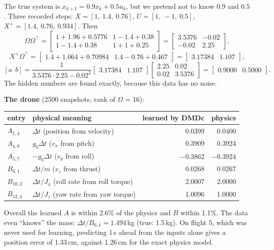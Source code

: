 \begin{toy}
The true system is $x_{k+1}=0.9x_k+0.5u_k$, but we pretend not to know $0.9$ and $0.5$. Three recorded steps:
$X=[1,\ 1.4,\ 0.76]$, $U=[1,\ -1,\ 0.5]$, $X^+=[1.4,\ 0.76,\ 0.934]$. Then
\[
\Omega\Omega^\top=\begin{bmatrix}1+1.96+0.5776 & 1-1.4+0.38\\ 1-1.4+0.38 & 1+1+0.25\end{bmatrix}=\begin{bmatrix}3.5376&-0.02\\-0.02&2.25\end{bmatrix},
\]
\[
X^+\Omega^\top=\begin{bmatrix}1.4+1.064+0.70984 & 1.4-0.76+0.467\end{bmatrix}=\begin{bmatrix}3.17384&1.107\end{bmatrix},
\]
\[
[a\ \ b]=\frac{1}{3.5376\cdot2.25-0.02^2}\begin{bmatrix}3.17384&1.107\end{bmatrix}\begin{bmatrix}2.25&0.02\\0.02&3.5376\end{bmatrix}=\begin{bmatrix}0.9000&0.5000\end{bmatrix}.
\]
The hidden numbers are found exactly, because this data has no noise.

\textbf{The drone} (2500 snapshots, rank of $\Omega$ = 16):
\begin{center}\small
\begin{tabular}{@{}llrr@{}}
\toprule
entry & physical meaning & learned by DMDc & physics\\
\midrule
$A_{1,4}$ & $\Delta t$ (position from velocity) & 0.0399 & 0.0400\\
$A_{4,8}$ & $g_0\Delta t$ ($v_x$ from pitch) & 0.3909 & 0.3924\\
$A_{5,7}$ & $-g_0\Delta t$ ($v_y$ from roll) & $-0.3862$ & $-0.3924$\\
$B_{6,1}$ & $\Delta t/m$ ($v_z$ from thrust) & 0.0268 & 0.0267\\
$B_{10,2}$ & $\Delta t/J_x$ (roll rate from roll torque) & 2.0007 & 2.0000\\
$B_{12,4}$ & $\Delta t/J_z$ (yaw rate from yaw torque) & 1.0096 & 1.0000\\
\bottomrule
\end{tabular}
\end{center}
Overall the learned $A$ is within 2.6\% of the physics and $B$ within 1.1\%. The data even ``knows'' the mass:
$\Delta t/B_{6,1}=1.494$\,kg (true: 1.5\,kg). On flight 5, which was never used for learning, predicting 1\,s ahead from the
inputs alone gives a position error of 1.33\,cm, against 1.26\,cm for the exact physics model.
\end{toy}

